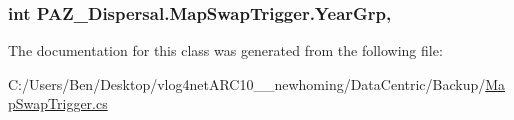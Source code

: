 \hypertarget{class_p_a_z___dispersal_1_1_map_swap_trigger_a80369f151c45db45a66c9e87fa89a00e}{
\subsubsection[{Year\-Grp}]{\setlength{\rightskip}{0pt plus 5cm}int P\-A\-Z\-\_\-\-Dispersal.\-Map\-Swap\-Trigger.\-Year\-Grp\hspace{0.3cm}{\ttfamily [get]}, {\ttfamily [set]}}}\label{class_p_a_z___dispersal_1_1_map_swap_trigger_a80369f151c45db45a66c9e87fa89a00e}


The documentation for this class was generated from the following file\-:\begin{DoxyCompactItemize}
\item 
C\-:/\-Users/\-Ben/\-Desktop/vlog4net\-A\-R\-C10\-\_\-\_\-newhoming/\-Data\-Centric/\-Backup/\hyperlink{_backup_2_map_swap_trigger_8cs}{Map\-Swap\-Trigger.\-cs}\end{DoxyCompactItemize}
